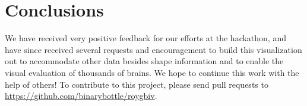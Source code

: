 \documentclass[twocolumn]{bmcart}%
\begin{document}
\section{Conclusions}\label{conclusions}

We have received very positive feedback for our efforts at the
hackathon, and have since received several requests and encouragement to
build this visualization out to accommodate other data besides shape
information and to enable the visual evaluation of thousands of brains.
We hope to continue this work with the help of others! To contribute to
this project, please send pull requests to
\url{https://github.com/binarybottle/roygbiv}.

\end{document}
